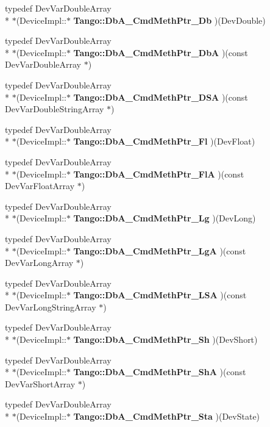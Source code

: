 \begin{DoxyCompactItemize}
typedef Dev\-Var\-Double\-Array \\*
$\ast$(Device\-Impl\-::$\ast$ {\bf Tango\-::\-Db\-A\-\_\-\-Cmd\-Meth\-Ptr\-\_\-\-Db} )(Dev\-Double)
\item 
typedef Dev\-Var\-Double\-Array \\*
$\ast$(Device\-Impl\-::$\ast$ {\bf Tango\-::\-Db\-A\-\_\-\-Cmd\-Meth\-Ptr\-\_\-\-Db\-A} )(const Dev\-Var\-Double\-Array $\ast$)
\item 
typedef Dev\-Var\-Double\-Array \\*
$\ast$(Device\-Impl\-::$\ast$ {\bf Tango\-::\-Db\-A\-\_\-\-Cmd\-Meth\-Ptr\-\_\-\-D\-S\-A} )(const Dev\-Var\-Double\-String\-Array $\ast$)
\item 
typedef Dev\-Var\-Double\-Array \\*
$\ast$(Device\-Impl\-::$\ast$ {\bf Tango\-::\-Db\-A\-\_\-\-Cmd\-Meth\-Ptr\-\_\-\-Fl} )(Dev\-Float)
\item 
typedef Dev\-Var\-Double\-Array \\*
$\ast$(Device\-Impl\-::$\ast$ {\bf Tango\-::\-Db\-A\-\_\-\-Cmd\-Meth\-Ptr\-\_\-\-Fl\-A} )(const Dev\-Var\-Float\-Array $\ast$)
\item 
typedef Dev\-Var\-Double\-Array \\*
$\ast$(Device\-Impl\-::$\ast$ {\bf Tango\-::\-Db\-A\-\_\-\-Cmd\-Meth\-Ptr\-\_\-\-Lg} )(Dev\-Long)
\item 
typedef Dev\-Var\-Double\-Array \\*
$\ast$(Device\-Impl\-::$\ast$ {\bf Tango\-::\-Db\-A\-\_\-\-Cmd\-Meth\-Ptr\-\_\-\-Lg\-A} )(const Dev\-Var\-Long\-Array $\ast$)
\item 
typedef Dev\-Var\-Double\-Array \\*
$\ast$(Device\-Impl\-::$\ast$ {\bf Tango\-::\-Db\-A\-\_\-\-Cmd\-Meth\-Ptr\-\_\-\-L\-S\-A} )(const Dev\-Var\-Long\-String\-Array $\ast$)
\item 
typedef Dev\-Var\-Double\-Array \\*
$\ast$(Device\-Impl\-::$\ast$ {\bf Tango\-::\-Db\-A\-\_\-\-Cmd\-Meth\-Ptr\-\_\-\-Sh} )(Dev\-Short)
\item 
typedef Dev\-Var\-Double\-Array \\*
$\ast$(Device\-Impl\-::$\ast$ {\bf Tango\-::\-Db\-A\-\_\-\-Cmd\-Meth\-Ptr\-\_\-\-Sh\-A} )(const Dev\-Var\-Short\-Array $\ast$)
\item 
typedef Dev\-Var\-Double\-Array \\*
$\ast$(Device\-Impl\-::$\ast$ {\bf Tango\-::\-Db\-A\-\_\-\-Cmd\-Meth\-Ptr\-\_\-\-Sta} )(Dev\-State)
\item 

\end{DoxyCompactItemize}
